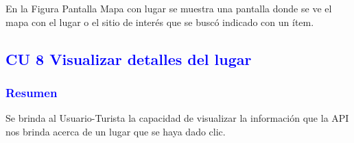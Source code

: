 En la Figura Pantalla  Mapa con lugar se muestra una pantalla donde se ve el mapa con el lugar o el sitio de interés que se buscó indicado con un ítem.\\
\newpage



\pagebreak
\newpage
\subsection{\textcolor{blue}{CU 8 Visualizar detalles del lugar}}

\subsubsection{\textcolor{blue}{Resumen}}{
Se brinda al Usuario-Turista la capacidad de visualizar la información que la API nos brinda acerca de un lugar que se haya dado clic.
}

